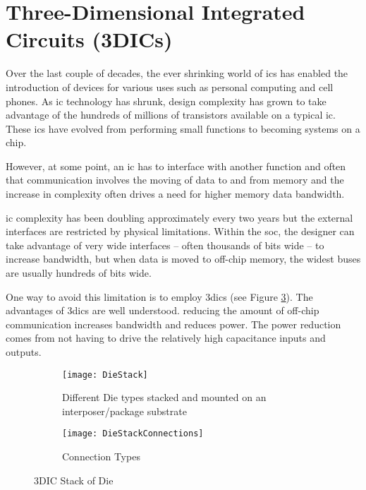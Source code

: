 

\section{Three-Dimensional Integrated Circuits (3DICs)}
\label{sec:3dic}

Over the last couple of decades, the ever shrinking world of \acp{ic} has enabled the introduction of devices for various uses such as personal computing and cell phones.
As \ac{ic} technology has shrunk, design complexity has grown to take advantage of the hundreds of millions of transistors available on a typical \ac{ic}.
These \acp{ic} have evolved from performing small functions to becoming systems on a chip.

However, at some point, an \ac{ic} has to interface with another function and often that communication involves the moving of data to and from memory and the increase in complexity often drives a need for higher memory data bandwidth. 

\acf{ic} complexity has been doubling approximately every two years but the external interfaces are restricted by physical limitations.
Within the \ac{soc}, the designer can take advantage of very wide interfaces -- often thousands of bits wide -- to increase bandwidth, but when data is moved to off-chip memory, the widest buses are usually hundreds of bits wide.

One way to avoid this limitation is to employ \acp{3dic} (see Figure \ref{fig:3DIC Die}). The advantages of \acp{3dic} are well understood. reducing the amount of off-chip communication increases bandwidth and reduces power. The power reduction comes from not having to drive the relatively
high capacitance inputs and outputs.

\begin{figure}
\centering
\begin{subfigure}{.8\textwidth}
  \centering
  \texttt{[image: DieStack]}
  \captionsetup{justification=centering, skip=5pt}
  \caption{Different Die types stacked and mounted on an interposer/package substrate}
  \label{fig:Die Stack}
\end{subfigure}%

\bigskip

\begin{subfigure}{.8\textwidth}
  \centering
  \texttt{[image: DieStackConnections]}
  \captionsetup{justification=centering, skip=5pt}
  \caption{Connection Types}
  \label{fig:Die Stack Connection Types}
\end{subfigure}
\captionsetup{justification=centering, skip=12pt}
\caption[3DIC Stack of Die]{3DIC Stack of Die}
\label{fig:3DIC Die}
\end{figure}

